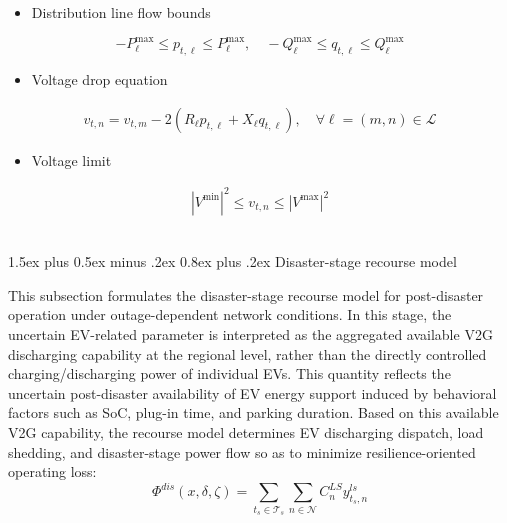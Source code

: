 \documentclass[journal]{IEEEtran}
\makeatletter
\renewcommand\subsubsection{\@startsection{subsubsection}{3}{\z@}%
  {1.5ex plus 0.5ex minus .2ex}%
  {0.8ex plus .2ex}%
  {\normalfont\normalsize\bfseries}}
\providecommand{\1}{\mathbf{1}}
\makeatother
\begin{document}
\begin{itemize}
    \item Distribution line flow bounds
\end{itemize}
\begin{equation}
-P^{\max}_{\ell} \le p_{t,{\ell}}\le P^{\max}_{\ell}
,\quad
-Q^{\max}_{\ell} \le q_{t,{\ell}} \le Q^{\max}_{\ell}
\end{equation}

\begin{itemize}
    \item Voltage drop equation
\end{itemize}
\begin{equation}
\begin{aligned}
v_{{t},n}
=
v_{{t},m}
-
2\left(
R_{\ell} p_{t,{\ell}}
+
X_{\ell}q_{t,{\ell}}
\right),\quad \forall \ell=(m,n)\in \mathcal{L}
\label{eq:lindistflow_voltage}
\end{aligned}
\end{equation}

\begin{itemize}
    \item Voltage limit
\end{itemize}
\begin{equation}
\begin{aligned}
\left|V^{\min} \right|^2\leq v_{t,n}\leq \left|V^{\max}\right|^2
\label{eq:lindistflow_voltage}
\end{aligned}
\end{equation}



\\
\subsubsection{Disaster-stage recourse model}

This subsection formulates the disaster-stage recourse model for post-disaster operation under outage-dependent network conditions. In this stage, the uncertain EV-related parameter is interpreted as the aggregated available V2G discharging capability at the regional level, rather than the directly controlled charging/discharging power of individual EVs. This quantity reflects the uncertain post-disaster availability of EV energy support induced by behavioral factors such as SoC, plug-in time, and parking duration. Based on this available V2G capability, the recourse model determines EV discharging dispatch, load shedding, and disaster-stage power flow so as to minimize resilience-oriented operating loss:
\begin{equation}
\Phi^{{dis}}(x,\delta,\zeta) =
\sum_{t_s\in\mathcal T_s}\sum_{n\in\mathcal N}C_n^{LS}
y^{ls}_{t_s,n}
\label{eq:resilience}
\end{equation}
\end{document}
